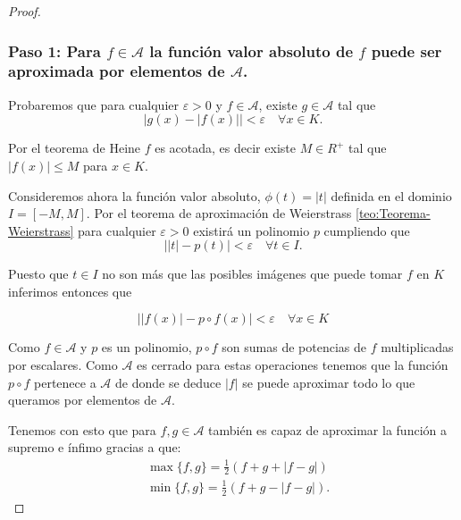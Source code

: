 \begin{proof}
    \subsubsection*{Paso 1: Para $f \in \mathcal{A}$ la función valor absoluto de $f$ puede ser aproximada por elementos
     de $\mathcal{A}$.}
    Probaremos que 
    para cualquier $\varepsilon > 0$ y $f \in \mathcal{A}$, 
    existe $g \in \mathcal{A}$  tal que 
    \begin{equation*}
        \big| g(x) - |f(x)|\big| < \varepsilon \quad \forall x \in K.
    \end{equation*}

     Por el teorema de Heine $f$ es acotada, es decir existe $M \in R^+$ tal que  $|f(x)| \leq M$ para $x \in K.$  

    Consideremos ahora la función valor absoluto, $\phi(t)=|t|$ definida en el dominio $I = [-M, M].$
    Por el teorema de aproximación de Weierstrass 
    \ref{teo:Teorema-Weierstrass}
    para cualquier $\varepsilon > 0$ 
    existirá un polinomio $p$ cumpliendo que 
    \begin{equation}
        \big||t|- p(t)\big| < \varepsilon \quad \forall t \in I.
    \end{equation}

    Puesto que $t \in I$ no son más que las posibles imágenes que puede tomar $f$ en $K$ inferimos entonces que 

    \begin{equation}
        \big||f(x)| - p \circ f(x)\big | < \varepsilon \quad \forall x \in K
    \end{equation}

    Como $f \in \mathcal{A}$ y $p$ es un polinomio, 
     $p \circ f$ son sumas de potencias  de $f$ multiplicadas por escalares.
    Como $\mathcal{A}$ es cerrado para estas operaciones tenemos que la función 
    $p \circ f$ pertenece a $\mathcal{A}$ de donde se deduce  
    $|f|$ se puede aproximar todo lo que queramos por elementos de $\mathcal{A}$. 

    Tenemos con esto que para $f,g \in \mathcal{A}$ también es capaz de aproximar la función
     a supremo e ínfimo  gracias a que:
    \begin{align} \label{eq:cerrado-min-max}
        & \max\{f,g\} = \frac{1}{2} (f+g+ |f-g|) \\
        & \min \{f,g\} = \frac{1}{2} (f+g -|f-g|). 
    \end{align}  
    


\end{proof}
